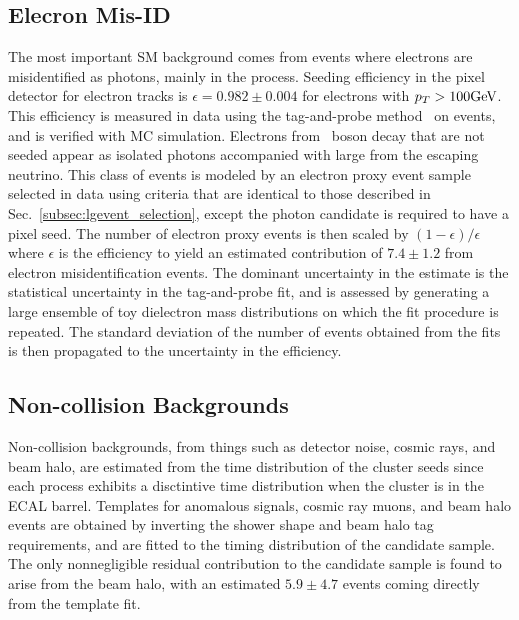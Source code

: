  \subsection{Elecron Mis-ID}
The most important SM background comes from events where
 electrons are misidentified as photons, mainly in the \wen process. 
Seeding efficiency in the pixel detector for
 electron tracks is $\epsilon = 0.982 \pm 0.004$ for
 electrons with $p_T > 100\mathrm{GeV}$. 
This efficiency is measured in data using the
 tag-and-probe method~\cite{Khachatryan:2010xn} on \zee events,
 and is verified with MC simulation. 
Electrons from \w\ boson decay that are not seeded
 appear as isolated photons accompanied with large \met from the escaping neutrino. 
This class of events is modeled by an electron proxy event sample
 selected in data using criteria that are identical to those described in 
 Sec.~\ref{subsec:lgevent_selection}, except the photon candidate is required to have
a pixel seed. 
The number of electron proxy events is then scaled by
 $(1-\epsilon)/\epsilon$ where $\epsilon$ is the efficiency
 to yield an estimated contribution of $7.4 \pm 1.2$ from
 electron misidentification events. 
The dominant uncertainty in the 
 estimate is the statistical uncertainty in the tag-and-probe fit, 
 and is assessed by generating a large ensemble
 of toy dielectron mass distributions
 on which the fit procedure is repeated. 
The standard deviation of the number
 of \zee events obtained from the fits is then propagated
 to the uncertainty in the efficiency.

 \subsection{Non-collision Backgrounds}
Non-collision backgrounds,  from  things such as detector noise,
 cosmic rays, and beam halo, are estimated from the time distribution of the cluster seeds
 since each process exhibits a disctintive time distribution when the cluster is
 in the ECAL barrel. 
Templates for anomalous signals, cosmic ray muons, and beam halo events
 are obtained by inverting the shower shape and beam halo tag requirements,
 and are fitted to the timing distribution of the candidate sample.
The only nonnegligible residual contribution to the candidate sample
 is found to arise from the beam halo, with an estimated $5.9\pm4.7$ events
 coming directly from the template fit.


